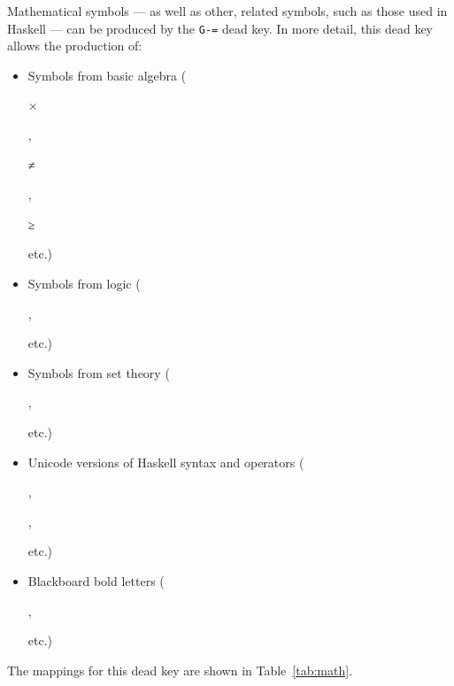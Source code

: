 \documentclass[oneside]{memoir}
\newcommand{\key}{\verb}
\newcommand{\out}[1]{\colorbox{gray!20}{\strut{}#1}}
\begin{document}
Mathematical symbols --- as well as other, related symbols, such as those used in Haskell --- can be produced by the \key|G-=| dead key.
In more detail, this dead key allows the production of:
\begin{itemize}[noitemsep]
\item Symbols from basic algebra (\out{×}, \out{≠}, \out{≥} etc.)
\item Symbols from logic (\out{}, \out{} etc.)
\item Symbols from set theory (\out{}, \out{} etc.)
\item Unicode versions of Haskell syntax and operators (\out{}, \out{}, \out{} etc.)
\item Blackboard bold letters (\out{}, \out{} etc.)
\end{itemize}
The mappings for this dead key are shown in Table~\ref{tab:math}.
\end{document}
